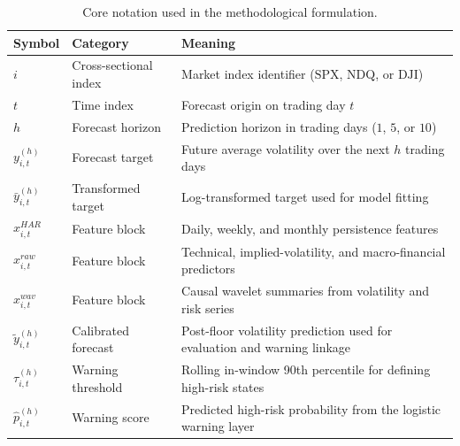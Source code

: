 \begin{table}[H]
\caption{Core notation used in the methodological formulation.}
\label{tab:notation}
\centering
\small
\setlength{\tabcolsep}{4pt}
\renewcommand{\arraystretch}{1.12}
\begin{tabularx}{\textwidth}{>{\raggedright\arraybackslash}p{}>{\raggedright\arraybackslash}p{}X}
\toprule
Symbol & Category & Meaning \\
\midrule
\(i\) & Cross-sectional index & Market index identifier (\(\mathrm{SPX}\), \(\mathrm{NDQ}\), or \(\mathrm{DJI}\)) \\
\(t\) & Time index & Forecast origin on trading day \(t\) \\
\(h\) & Forecast horizon & Prediction horizon in trading days (\(1\), \(5\), or \(10\)) \\
\(y_{i,t}^{(h)}\) & Forecast target & Future average volatility over the next \(h\) trading days \\
\(\bar y_{i,t}^{(h)}\) & Transformed target & Log-transformed target used for model fitting \\
\(x_{i,t}^{HAR}\) & Feature block & Daily, weekly, and monthly persistence features \\
\(x_{i,t}^{raw}\) & Feature block & Technical, implied-volatility, and macro-financial predictors \\
\(x_{i,t}^{wav}\) & Feature block & Causal wavelet summaries from volatility and risk series \\
\(\tilde y_{i,t}^{(h)}\) & Calibrated forecast & Post-floor volatility prediction used for evaluation and warning linkage \\
\(\tau_{i,t}^{(h)}\) & Warning threshold & Rolling in-window 90th percentile for defining high-risk states \\
\(\hat p_{i,t}^{(h)}\) & Warning score & Predicted high-risk probability from the logistic warning layer \\
\bottomrule
\end{tabularx}
\end{table}
